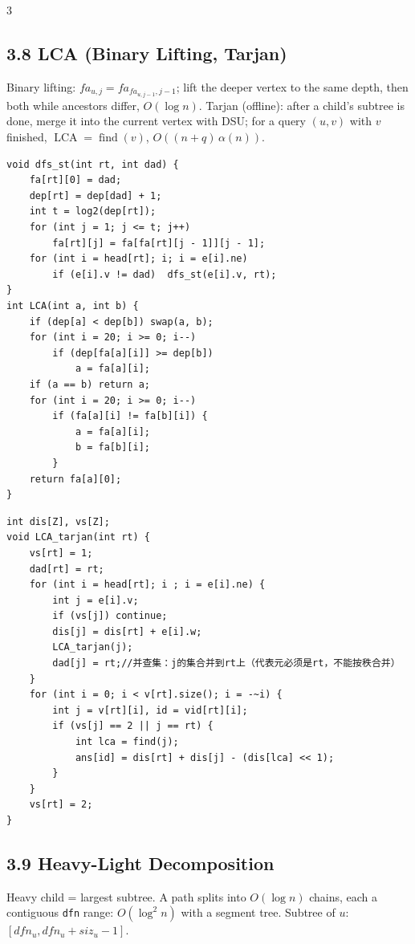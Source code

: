 \documentclass[8pt]{extarticle}
\begin{document}
\begin{multicols*}{3}
\subsection*{3.8 LCA (Binary Lifting, Tarjan)}

Binary lifting: $fa_{u,j} = fa_{fa_{u,j-1}, j-1}$; lift the deeper vertex to the same depth, then both while ancestors differ, $O(\log n)$. Tarjan (offline): after a child's subtree is done, merge it into the current vertex with DSU; for a query $(u, v)$ with $v$ finished, $\operatorname{LCA} = \operatorname{find}(v)$, $O((n + q)\,\alpha(n))$.


\begin{lstlisting}
void dfs_st(int rt, int dad) {
    fa[rt][0] = dad;
    dep[rt] = dep[dad] + 1;
    int t = log2(dep[rt]);
    for (int j = 1; j <= t; j++)
        fa[rt][j] = fa[fa[rt][j - 1]][j - 1];
    for (int i = head[rt]; i; i = e[i].ne)
        if (e[i].v != dad)  dfs_st(e[i].v, rt);
}
int LCA(int a, int b) {
    if (dep[a] < dep[b]) swap(a, b);
    for (int i = 20; i >= 0; i--)
        if (dep[fa[a][i]] >= dep[b])
            a = fa[a][i];
    if (a == b) return a;
    for (int i = 20; i >= 0; i--)
        if (fa[a][i] != fa[b][i]) {
            a = fa[a][i];
            b = fa[b][i];
        }
    return fa[a][0];
}
\end{lstlisting}

\begin{lstlisting}
int dis[Z], vs[Z];
void LCA_tarjan(int rt) {
    vs[rt] = 1;
    dad[rt] = rt;
    for (int i = head[rt]; i ; i = e[i].ne) {
        int j = e[i].v;
        if (vs[j]) continue;
        dis[j] = dis[rt] + e[i].w;
        LCA_tarjan(j);
        dad[j] = rt;//并查集：j的集合并到rt上（代表元必须是rt，不能按秩合并）
    }
    for (int i = 0; i < v[rt].size(); i = -~i) {
        int j = v[rt][i], id = vid[rt][i];
        if (vs[j] == 2 || j == rt) {
            int lca = find(j);
            ans[id] = dis[rt] + dis[j] - (dis[lca] << 1);
        }
    }
    vs[rt] = 2;
}
\end{lstlisting}

\subsection*{3.9 Heavy-Light Decomposition}

Heavy child = largest subtree. A path splits into $O(\log n)$ chains, each a contiguous \texttt{dfn} range: $O(\log^2 n)$ with a segment tree. Subtree of $u$: $[dfn_u, dfn_u + siz_u - 1]$.



\end{multicols*}
\end{document}
